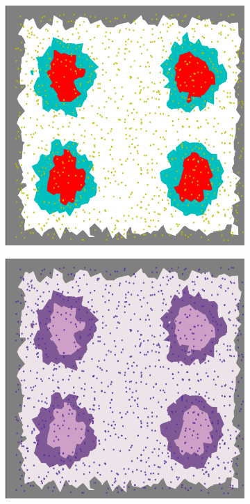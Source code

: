 \documentclass[12pt,a4paper]{report}
\begin{document}
\begin{description}
        \begin{figure}
            \centering
            \begin{subfigure}[t]{0.2\textwidth}
                 \centering
                 \includegraphics[width = \textwidth]{images/nuclei_mask}
                 \label{fig:nuclei_mask}
            \end{subfigure}
            \quad
            \begin{subfigure}[t]{0.2\textwidth}
                 \centering
                 \includegraphics[width = \textwidth]{images/nuclei_real}

\end{subfigure}
\end{figure}
\end{description}
\end{document}
